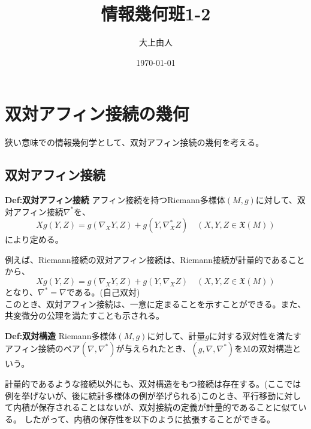 \documentclass[a4paper,11pt]{jsarticle}
\numberwithin{equation}{section}
\begin{document}
\title{情報幾何班1-2}
\author{大上由人}
\date{\today}
\maketitle

\section{双対アフィン接続の幾何}
狭い意味での情報幾何学として、双対アフィン接続の幾何を考える。\\
\subsection{双対アフィン接続}
\begin{itembox}[l]{\textbf{Def:双対アフィン接続}}
    アフィン接続を持つRiemann多様体$(M,g)$に対して、双対アフィン接続$\nabla ^*$を、
    \begin{equation}
        Xg(Y,Z) = g(\nabla_X Y,Z) + g(Y,\nabla^*_X Z) \quad (X,Y,Z \in \mathfrak{X}(M))
    \end{equation}
    により定める。
\end{itembox}
例えば、Riemann接続の双対アフィン接続は、Riemann接続が計量的であることから、
\begin{equation}
    Xg(Y, Z) = g(\nabla_X Y, Z) + g(Y, \nabla_X Z) \quad (X, Y, Z \in \mathfrak{X}(M))
\end{equation}
となり、$\nabla^* = \nabla$である。(自己双対)\\
このとき、双対アフィン接続は、一意に定まることを示すことができる。また、共変微分の公理を満たすことも示される。\\

\begin{itembox}[l]{\textbf{Def:双対構造}}
    Riemann多様体$(M,g)$に対して、計量$g$に対する双対性を満たすアフィン接続のペア$(\nabla,\nabla^*)$が与えられたとき、$(g,\nabla,\nabla^*)$をMの双対構造という。
\end{itembox}
計量的であるような接続以外にも、双対構造をもつ接続は存在する。(ここでは例を挙げないが、後に統計多様体の例が挙げられる)このとき、平行移動に対して内積が保存されることはないが、双対接続の定義が計量的であることに似ている。
したがって、内積の保存性を以下のように拡張することができる。
\end{document}
